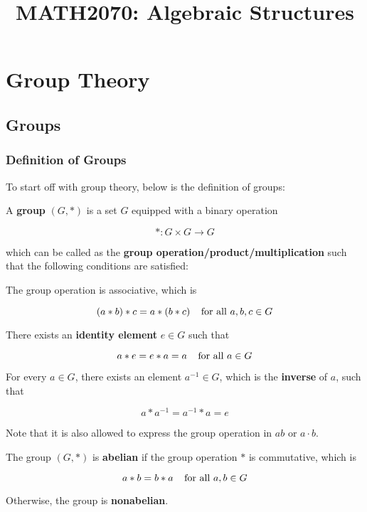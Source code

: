 \documentclass[a4paper,12pt]{article}
\begin{document}
\title{MATH2070: Algebraic Structures}


\remark{}



\section{Group Theory}
\subsection{Groups}
\subsubsection{Definition of Groups}
To start off with group theory, below is the definition of groups:\n

\begin{dft}
  A \textbf{group} $(G,*)$ is a set $G$ equipped with a binary operation

  $$*:G\times G\rightarrow G$$\s

  which can be called as the \textbf{group operation/product/multiplication} such that the following conditions are satisfied:

  \begin{alist}
    \item The group operation is associative, which is

    $$(a*b)*c=a*(b*c)\;\;\;\;\text{for all }a,b,c\in G$$

    \item There exists an \textbf{identity element} $e\in G$ such that

    $$a*e=e*a=a\;\;\;\;\text{for all }a\in G$$

    \item For every $a\in G$, there exists an element $a^{-1}\in G$, which is the \textbf{inverse} of $a$, such that

    $$a*a^{-1}=a^{-1}*a=e$$
  \end{alist}
\end{dft}\n

Note that it is also allowed to express the group operation in $ab$ or $a\cdot b$.\n

\begin{dft}
  The group $(G,*)$ is \textbf{abelian} if the group operation $*$ is commutative, which is

  $$a*b=b*a\;\;\;\;\text{for all }a,b\in G$$\s

  Otherwise, the group is \textbf{nonabelian}.
\end{dft}\n
\end{document}
